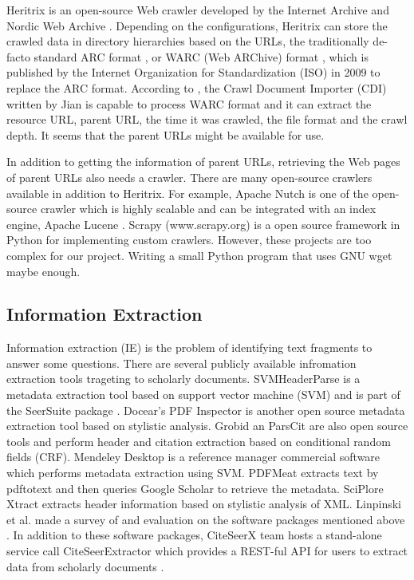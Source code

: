 \documentclass[prodmode]{acmsmall} %
\begin{document}
Heritrix is an open-source Web crawler developed by the Internet Archive and Nordic Web Archive \cite{Mohr2004}. Depending on the configurations, Heritrix can store the crawled data in directory hierarchies based on the URLs, the traditionally de-facto standard ARC format \cite{Burner1996}, or WARC (Web ARChive) format \cite{ISO2009}, which is published by the Internet Organization for Standardization (ISO) in 2009 to replace the ARC format. According to \cite{Wu2012}, the Crawl Document Importer (CDI) written by Jian is capable to process WARC format and it can extract the resource URL, parent URL, the time it was crawled, the file format and the crawl depth. It seems that the parent URLs might be available for use.

In addition to getting the information of parent URLs, retrieving the Web pages of parent URLs also needs a crawler. There are many open-source crawlers available in addition to Heritrix. For example, Apache Nutch is one of the open-source crawler  which is highly scalable and can be integrated with an index engine, Apache Lucene \cite{Khare2004}. Scrapy (www.scrapy.org) is a open source framework in Python for implementing custom crawlers. However, these projects are too complex for our project. Writing a small Python program that uses GNU wget \cite{Niksic1996} maybe enough.

\subsection{Information Extraction}
Information extraction (IE) is the problem of identifying text fragments to answer some questions. There are several publicly available infromation extraction tools trageting to scholarly documents. SVMHeaderParse is a metadata extraction tool based on support vector machine (SVM) and is part of the SeerSuite package \cite{Han2003}.  Docear's PDF Inspector is another open source metadata extraction tool based on stylistic analysis. Grobid \cite{Lopez2009} an ParsCit \cite{Councill2008} are also open source tools and perform header and citation extraction based on conditional random fields (CRF). Mendeley Desktop is a reference manager commercial software which performs metadata extraction using SVM. PDFMeat \cite{Aumuller2011} extracts text by pdftotext and then queries Google Scholar to retrieve the metadata. SciPlore Xtract \cite{Beel2010} extracts header information based on stylistic analysis of XML. Linpinski et al. made a survey of and evaluation on the software packages mentioned above \cite{Lipinski2013}. In addition to these software packages, CiteSeerX team hosts a stand-alone service call CiteSeerExtractor which provides a REST-ful API for users to extract data from scholarly documents \cite{Williams2014}.
\end{document}
